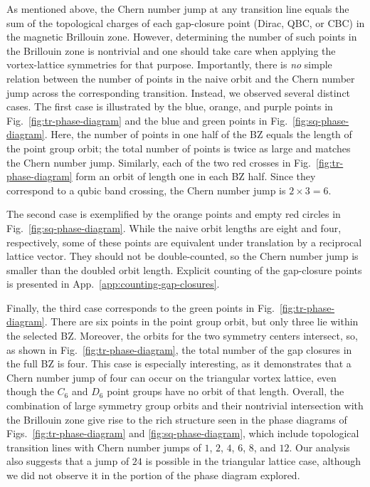 \documentclass[10pt,prb,aps,superscriptaddress,amsmath,amssymb,twocolumn,floatfix,longbibliography]{revtex4-1}
\begin{document}
As mentioned above, the Chern number jump at any transition line equals the sum of the topological charges of each gap-closure point (Dirac, QBC, or CBC) in the magnetic Brillouin zone. However, determining the number of such points in the Brillouin zone is nontrivial and one should take care when applying the vortex-lattice symmetries for that purpose.
Importantly, there is \textit{no} simple relation between the number of points in the naive orbit and the  Chern number jump across the corresponding transition. Instead, we observed several distinct cases. The first case is illustrated by the blue, orange, and purple points in Fig.~\ref{fig:tr-phase-diagram} and the blue and green points in Fig.~\ref{fig:sq-phase-diagram}. Here, the number of points in one half of the BZ equals the length of the point group orbit; the total number of points is twice as large and matches the Chern number jump. Similarly, each of the two red crosses in Fig.~\ref{fig:tr-phase-diagram} form an orbit of length one in each BZ half. Since they correspond to a qubic band crossing, the Chern number jump is  $2\times3 = 6$. 

The second case is exemplified by the orange points and empty red circles in Fig.~\ref{fig:sq-phase-diagram}. While the naive orbit lengths are eight and four, respectively, some of these points are equivalent under translation by a reciprocal lattice vector. They should not be double-counted, so the Chern number jump is smaller than the doubled orbit length. Explicit counting of the gap-closure points is presented in App.~\ref{app:counting-gap-closures}.

Finally, the third case corresponds to the green points in Fig.~\ref{fig:tr-phase-diagram}. There are six points in the point group orbit, but only three lie within the selected BZ. Moreover, the orbits for the two symmetry centers intersect, so, as shown in Fig.~\ref{fig:tr-phase-diagram}, the total number of the gap closures in the full BZ is four. This case is especially interesting, as it demonstrates that a Chern number jump of four can occur on the triangular vortex lattice, even though the $C_6$ and $D_6$ point groups have no orbit of that length. Overall, the combination of large symmetry group orbits and their nontrivial intersection with the Brillouin zone give rise to the rich structure seen in the phase diagrams of Figs.~\ref{fig:tr-phase-diagram} and \ref{fig:sq-phase-diagram}, which include topological transition lines with Chern number jumps of $1$, $2$, $4$, $6$, $8$, and $12$. Our analysis also suggests that a jump of $24$ is possible in the triangular lattice case, although we did not observe it in the portion of the phase diagram explored.
\end{document}
